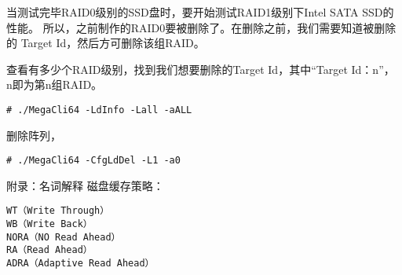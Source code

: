 当测试完毕RAID0级别的SSD盘时，要开始测试RAID1级别下Intel SATA SSD的性能。
所以，之前制作的RAID0要被删除了。在删除之前，我们需要知道被删除的
Target Id，然后方可删除该组RAID。

查看有多少个RAID级别，找到我们想要删除的Target Id，其中“Target Id：n”，
n即为第n组RAID。

\begin{verbatim}
# ./MegaCli64 -LdInfo -Lall -aALL 
\end{verbatim}

删除阵列，
\begin{verbatim}
# ./MegaCli64 -CfgLdDel -L1 -a0
\end{verbatim}
	
附录：名词解释
磁盘缓存策略：
\begin{verbatim}
WT（Write Through）
WB（Write Back）
NORA（NO Read Ahead）
RA（Read Ahead）
ADRA（Adaptive Read Ahead）
\end{verbatim}

% 


